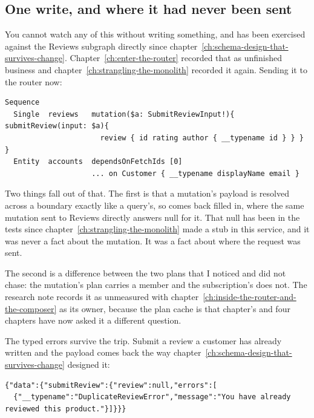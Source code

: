 \subsection*{One write, and where it had never been sent}

%
You cannot watch any of this without writing something, and
 has been exercised against the Reviews subgraph directly
since chapter~\ref{ch:schema-design-that-survives-change}.
Chapter~\ref{ch:enter-the-router} recorded that as unfinished business and
chapter~\ref{ch:strangling-the-monolith} recorded it again. Sending it to the
router now:

\begin{verbatim}
Sequence
  Single  reviews   mutation($a: SubmitReviewInput!){ submitReview(input: $a){
                      review { id rating author { __typename id } } } }
  Entity  accounts  dependsOnFetchIds [0]
                    ... on Customer { __typename displayName email }
\end{verbatim}

Two things fall out of that. The first is that a mutation's payload is resolved
across a boundary exactly like a query's, so 
comes back filled in, where the same mutation sent to Reviews directly answers
null for it. That null has been in the tests since
chapter~\ref{ch:strangling-the-monolith} made  a stub in this
service, and it was never a fact about the mutation. It was a fact about where
the request was sent.

The second is a difference between the two plans that I noticed and did not
chase: the mutation's plan carries a  member and the
subscription's does not. The research note records it as unmeasured with
chapter~\ref{ch:inside-the-router-and-the-composer} as its owner, because the
plan cache is that chapter's and four chapters have now asked it a different
question.

%
The typed errors survive the trip. Submit a review a customer has already
written and the payload comes back the way
chapter~\ref{ch:schema-design-that-survives-change} designed it:

\begin{verbatim}
{"data":{"submitReview":{"review":null,"errors":[
  {"__typename":"DuplicateReviewError","message":"You have already reviewed this product."}]}}}
\end{verbatim}

